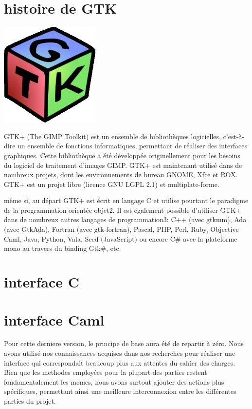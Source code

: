 \documentclass{report}
\begin{document}
	\section {histoire de GTK}

\begin{center}
\includegraphics[scale = 1]{GTK.png}
\end{center}

GTK+ (The GIMP Toolkit) est un ensemble de bibliothèques logicielles, c'est-à-dire un ensemble de fonctions informatiques, permettant de réaliser des interfaces graphiques. Cette bibliothèque a été développée originellement pour les besoins du logiciel de traitement d'images GIMP. GTK+ est maintenant utilisé dans de nombreux projets, dont les environnements de bureau GNOME, Xfce et ROX.
GTK+ est un projet libre (licence GNU LGPL 2.1) et multiplate-forme.

même si, au départ GTK+ est écrit en langage C et utilise pourtant le paradigme de la programmation orientée objet2. Il est également possible d'utiliser GTK+ dans de nombreux autres langages de programmation3: C++ (avec gtkmm), Ada (avec GtkAda), Fortran (avec gtk-fortran), Pascal, PHP, Perl, Ruby, Objective Caml, Java, Python, Vala, Seed (JavaScript) ou encore C\# avec la plateforme mono au travers du binding Gtk\#, etc.

	\section{interface C}

	\section{interface Caml}

Pour cette derniere version, le principe de base aura été de repartir à zéro. Nous avons utilisé nos connaissances acquises dans nos recherches pour réaliser une interface qui correspondait beaucoup plus aux attentes du cahier des charges. Bien que les methodes employées pour la plupart des parties restent fondamentalement les memes, nous avons surtout ajouter des actions plus spécifiques, permettant ainsi une meilleure interconnexion entre les différentes parties du projet.
\end{document}
